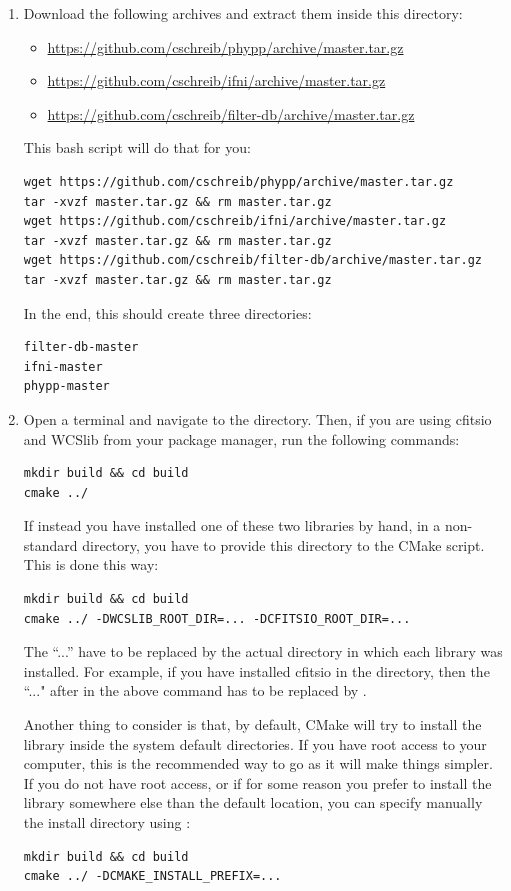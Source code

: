 \documentclass[12pt,a4paper]{article}
\begin{document}
\begin{enumerate}
\item Download the following archives and extract them inside this directory:
\begin{itemize}
\item \url{https://github.com/cschreib/phypp/archive/master.tar.gz}
\item \url{https://github.com/cschreib/ifni/archive/master.tar.gz}
\item \url{https://github.com/cschreib/filter-db/archive/master.tar.gz}
\end{itemize}

This bash script will do that for you:
\begin{verbatim}
wget https://github.com/cschreib/phypp/archive/master.tar.gz
tar -xvzf master.tar.gz && rm master.tar.gz
wget https://github.com/cschreib/ifni/archive/master.tar.gz
tar -xvzf master.tar.gz && rm master.tar.gz
wget https://github.com/cschreib/filter-db/archive/master.tar.gz
tar -xvzf master.tar.gz && rm master.tar.gz
\end{verbatim}

In the end, this should create three directories:
\begin{verbatim}
filter-db-master
ifni-master
phypp-master
\end{verbatim}

\item Open a terminal and navigate to the  directory. Then, if you are using cfitsio and WCSlib from your package manager, run the following commands:
\begin{verbatim}
mkdir build && cd build
cmake ../
\end{verbatim}

If instead you have installed one of these two libraries by hand, in a non-standard directory, you have to provide this directory to the CMake script. This is done this way:
\begin{verbatim}
mkdir build && cd build
cmake ../ -DWCSLIB_ROOT_DIR=... -DCFITSIO_ROOT_DIR=...
\end{verbatim}

The ``...'' have to be replaced by the actual directory in which each library was installed. For example, if you have installed cfitsio in the  directory, then the ``..." after  in the above command has to be replaced by .

Another thing to consider is that, by default, CMake will try to install the library inside the system default directories. If you have root access to your computer, this is the recommended way to go as it will make things simpler. If you do not have root access, or if for some reason you prefer to install the library somewhere else than the default location, you can specify manually the install directory using :
\begin{verbatim}
mkdir build && cd build
cmake ../ -DCMAKE_INSTALL_PREFIX=...
\end{verbatim}


\end{enumerate}
\end{document}
